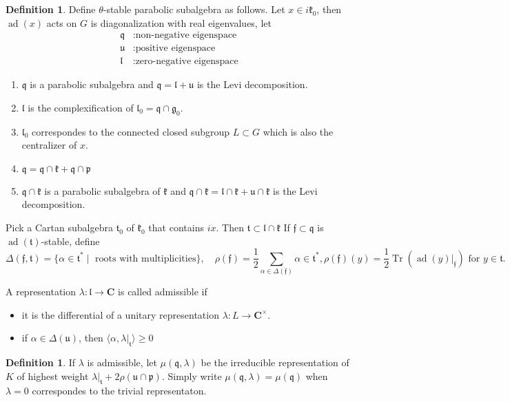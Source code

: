 \documentclass[leqno]{amsart}
\DeclareMathOperator{\adj}{ad}
\newcommand{\C}{\mathbf C}
\DeclareMathOperator{\Tr}{Tr}
\newcommand{\1}{\mathbf{1}}
\newcommand{\rfg}{\mathfrak{g}_0}
\newcommand{\rfk}{\mathfrak{k}_0}
\newcommand{\cfk}{\mathfrak{k}}
\newcommand{\cfp}{\mathfrak{p}}
\newcommand{\cfq}{\mathfrak{q}}
\newcommand{\cfu}{\mathfrak{u}}
\newcommand{\rfl}{\mathfrak{l}_0}
\newcommand{\cfl}{\mathfrak{l}}
\newcommand{\rft}{\mathfrak{t}_0}
\newcommand{\cft}{\mathfrak{t}}
\newcommand{\cff}{\mathfrak{f}}
\theoremstyle{definition}
\newtheorem{defn}[thm]{Definition}
\theoremstyle{remark}
\begin{document}
\begin{defn}
	Define $\theta$-stable parabolic
	subalgebra as follows.
	Let $x\in i\rfk$, then
	$\adj(x)$ acts on  $G$
	is diagonalization with real 
	eigenvalues, let
	\begin{align*}
		\cfq&\colon \text{non-negative eigenspace}\\
		\cfu&\colon \text{positive eigenspace}\\
		\cfl&\colon \text{zero-negative eigenspace}
	\end{align*}
        \begin{enumerate}[label=(\alph*)]
		\item $\cfq$ is a parabolic subalgebra and
		$\cfq=\cfl+\cfu$
		is the Levi decomposition.
		\item $\cfl$ is the complexification 
		of $\rfl=\cfq\cap \rfg$.
		\item $\rfl$ correspondes to 
		the connected closed subgroup $L\subset G$
		which is also the centralizer of  $x$.
		\item $\cfq=\cfq\cap\cfk+\cfq\cap\cfp$
		\item $\cfq\cap \cfk$ 
		is a parabolic subalgebra of $\cfk$ and
		$\cfq\cap\cfk=\cfl\cap\cfk+\cfu\cap\cfk$
		is the Levi decomposition.
       \end{enumerate}
       Pick a Cartan subalgebra 
       $\rft$ of  $\rfk$ that contains  $ix$.
       Then  $\cft\subset \cfl\cap\cfk$
       If $\cff\subset\cfq$ is  $\adj(\cft)$-stable, define
        \[
		\Delta(\cff,\cft)=\{\alpha\in \cft^*\mid 
		\text{ roots with multiplicities}\},\quad
		\rho(\cff)=\frac{1}{2}\sum_{\alpha\in \Delta(\cff)}
		\alpha\in \cft^*,
		\rho(\cff)(y)=\frac{1}{2}\Tr(\adj(y)\vert_{\cff})
		\text{ for }y\in \cft.
       \]
\end{defn}
A representation $\lambda\colon \cfl\to \C$ is called admissible
if 
\begin{itemize}
	\item it is the differential of a unitary representation
		$\lambda\colon L\to \C^\times$.
	\item if  $\alpha\in \Delta(\cfu)$, then
	$ \langle \alpha, \lambda\vert_{\cft}\rangle\geq 0$
\end{itemize}
\begin{defn}
	If $\lambda$ is admissible, let 
	$\mu(\cfq,\lambda)$ be the irreducible representation
	of  $K$ of highest weight  
	$\lambda\vert_{\cft}+2\rho(\cfu\cap \cfp)$.
	Simply write $\mu(\cfq,\lambda)=\mu(\cfq)$
	when  $\lambda=0$ correspondes to the trivial representaton.
\end{defn}
\end{document}
